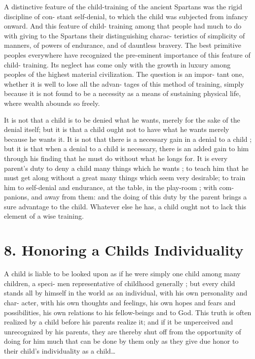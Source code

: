 \documentclass[
]{book}
\begin{document}
A distinctive feature of the child-training of the ancient Spartans was the rigid discipline of con- stant self-denial, to which the child was subjected from infancy onward. And this feature of child- training among that people had much to do with giving to the Spartans their distinguishing charac- teristics of simplicity of manners, of powers of endurance, and of dauntless bravery. The best primitive peoples everywhere have recognized the pre-eminent importance of this feature of child- training. Its neglect has come only with the growth in luxury among peoples of the highest material civilization. The question is an impor- tant one, whether it is well to lose all the advan- tages of this method of training, simply because it is not found to be a necessity as a means of sustaining physical life, where wealth abounds so freely.

It is not that a child is to be denied what he wants, merely for the sake of the denial itself; but it is that a child ought not to have what he wants merely because he wants it. It is not that there is a necessary gain in a denial to a child ; but it is that when a denial to a child is necessary, there is an added gain to him through his finding that he must do without what he longs for. It is every parent's duty to deny a child many things which he wants ; to teach him that he must get along without a great many things which seem very desirable; to train him to self-denial and endurance, at the table, in the play-room ; with com- panions, and away from them: and the doing of this duty by the parent brings a sure advantage to the child. Whatever else he has, a child ought not to lack this element of a wise training.

\hypertarget{honoring-a-childs-individuality}{%
\chapter{8. Honoring a Childs Individuality}\label{honoring-a-childs-individuality}}

A child is liable to be looked upon as if he were simply one child among many children, a speci- men representative of childhood generally ; but every child stands all by himself in the world as an individual, with his own personality and char- acter, with his own thoughts and feelings, his own hopes and fears and possibilities, his own relations to his fellow-beings and to God. This truth is often realized by a child before his parents realize it; and if it be unperceived and unrecognized by his parents, they are thereby shut off from the opportunity of doing for him much that can be done by them only as they give due honor to their child's individuality as a child\ldots{}
\end{document}
